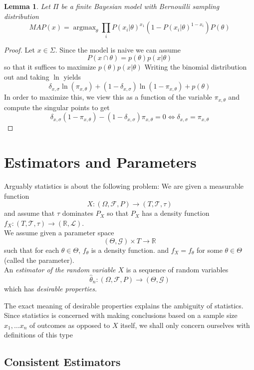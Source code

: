 \documentclass{book}
\theoremstyle{plain}
\newtheorem{lemma}[corollary]{Lemma}
\theoremstyle{definition}
\DeclareMathOperator{\argmax}{argmax}
\renewcommand{\d}[1]{\mathbb{#1}}
\newcommand{\mor}{\longrightarrow}
\renewcommand{\r}[1]{\mathcal{#1}}
\begin{document}
\begin{lemma}
Let $\Pi$ be a finite Bayesian model with Bernouilli sampling distribution
\[
MAP(x)=\argmax_\theta \prod_i P(x_i\vert \theta)^{x_1}(1-P(x_i\vert \theta)^{1-x_i})P(\theta)
\]
\end{lemma}


\begin{proof}
Let $x \in \Sigma$. Since the model is naive we can assume
\[
P(x\cap \theta)=p(\theta)p(x\vert \theta)
\]	
so that it suffices to maximize $p(\theta)p(x\vert \theta)$
Writing the binomial distribution out and taking $\ln$ yields
\[
\delta_{x,\sigma}\ln(\pi_{x,\theta})+(1-\delta_{x,\sigma})\ln(1-\pi_{x,\theta})+p(\theta)
\]
In order to maximize this, we view this as a function of the variable $\pi_{x,\theta}$ and compute the singular points to get
\[
\delta_{x,\sigma}(1-\pi_{x,\theta})-(1-\delta_{x,\sigma})\pi_{x,\theta}=0\iff \delta_{x,\sigma}=\pi_{x,\theta}
\]

\end{proof}



\section{Estimators and Parameters}

Arguably statistics is about the following problem: We are given a measurable function
\[
X:(\Omega, \r{F}, P)\mor (T,\r{T},\tau)
\]
and assume that $\tau$ dominates $P_X$ so that $P_X$ has a density function $f_X: (T,\r{T},\tau) \mor (\d{R},\r{L})$.\\
We assume given a parameter space
\[
(\Theta, \r{G})\times T\mor \d{R}
\]
such that for each $\theta \in \Theta$, $f_\theta$ is a density function. and $f_X=f_\theta$ for some $\theta \in \Theta$ (called the parameter).\\
An \emph{estimator of the random variable $X$} is a sequence of random variables
\[
\hat{\theta}_n:(\Omega,\r{F},P)\mor (\Theta, \r{G})
\] 
which has \emph{desirable properties.}
\begin{center}
The exact meaning of desirable properties explains the ambiguity of statistics. Since statistics is concerned with making conclusions based on a sample size $x_1,\ldots x_n$ of outcomes as opposed to $X$ itself, we shall only concern ourselves with definitions of this type
\end{center}
 
 
\subsection{Consistent Estimators}
\end{document}
